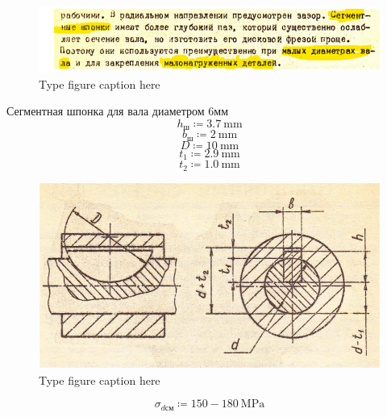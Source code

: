\documentclass{article}
\newcommand{\defeq}{\coloneq} %
\begin{document}
\begin{figure}[h!]
 \begin{center}
  \includegraphics[max width=\textwidth]{calculations/579.png}
  \caption{Type figure caption here}
  \label{fig:579}
 \end{center}
\end{figure}
\colorbox[HTML]{000000}{Сегментная шпонка для вала диаметром 6мм}\newline
\begin{equation*}
h_{ш} \defeq 3.7 \: \mathrm{mm}
\end{equation*}
\begin{equation*}
b_{ш} \defeq 2 \: \mathrm{mm}
\end{equation*}
\begin{equation*}
D \defeq 10 \: \mathrm{mm}
\end{equation*}
\begin{equation*}
\textit{t}_{\textit{1}} \defeq 2.9 \: \mathrm{mm}
\end{equation*}
\begin{equation*}
\textit{t}_{\textit{2}} \defeq 1.0 \: \mathrm{mm}
\end{equation*}
\begin{figure}[h!]
 \begin{center}
  \includegraphics[max width=\textwidth]{calculations/586.png}
  \caption{Type figure caption here}
  \label{fig:586}
 \end{center}
\end{figure}
\begin{equation*}
σ_{dсм} \defeq 150-180 \: \mathrm{MPa}
\end{equation*}
\end{document}
